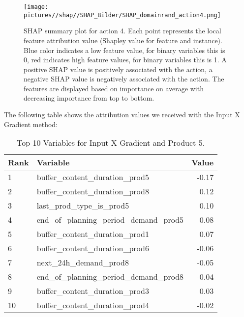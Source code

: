 \begin{figure}[H]
    \centering
    \texttt{[image: pictures//shap//SHAP\_Bilder/SHAP\_domainrand\_action4.png]}
    \caption{SHAP summary plot for action 4.
        Each point represents the local feature attribution value (Shapley value for feature and instance).
        Blue color indicates a low feature value, for binary variables this is 0, red indicates high feature values, for binary variables this is 1. A positive SHAP value is positively associated with the action, a negative SHAP value is negatively associated with the action. The features are displayed based on importance on average with decreasing importance from top to bottom.}
    \label{fig:SHAP_Action4}
\end{figure}

The following table shows the attribution values we received with the Input X Gradient method:

\begin{table}[ht!]
    \footnotesize
    \centering
    \caption{Top 10 Variables for Input X Gradient and Product 5.}
    \label{tab:top_variables_target4}
    \begin{tabularx}{\textwidth}{lXr}
        \toprule
        \textbf{Rank} & \textbf{Variable}                        & \textbf{Value} \\
        \midrule
        1             & buffer\_content\_duration\_prod5         & -0.17          \\
        2             & buffer\_content\_duration\_prod8         & 0.12           \\
        3             & last\_prod\_type\_is\_prod5              & 0.10           \\
        4             & end\_of\_planning\_period\_demand\_prod5 & 0.08           \\
        5             & buffer\_content\_duration\_prod1         & 0.07           \\
        6             & buffer\_content\_duration\_prod6         & -0.06          \\
        7             & next\_24h\_demand\_prod8                 & -0.05          \\
        8             & end\_of\_planning\_period\_demand\_prod8 & -0.04          \\
        9             & buffer\_content\_duration\_prod3         & 0.03           \\
        10            & buffer\_content\_duration\_prod4         & -0.02          \\
        \bottomrule
    \end{tabularx}
\end{table}
\FloatBarrier


